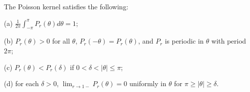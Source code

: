The Poisson kernel satisfies the following:

(a) $\frac{1}{2\pi} \int_{-\pi}^{\pi} P_r(\theta) d\theta = 1$;

(b) $P_r(\theta) > 0$ for all $\theta$, $P_r(-\theta) = P_r(\theta)$, and $P_r$ is periodic in $\theta$ with period $2\pi$;

(c) $P_r(\theta) < P_r(\delta)$ if $0 < \delta < |\theta| \leq \pi$;

(d) for each $\delta > 0$, $\lim_{r \to 1-} P_r(\theta) = 0$ uniformly in $\theta$ for $\pi \geq |\theta| \geq \delta$.
